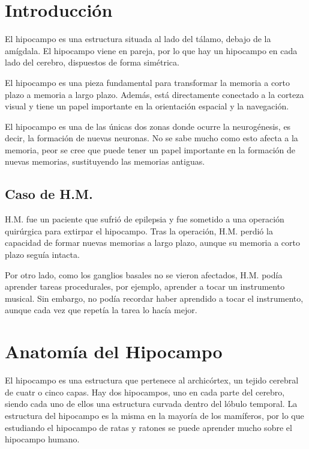 \documentclass[12pt, letterpaper]{article}
\title{\doctitle}
\author{Juan Luis Serradilla Tormos}
\date{\monthname[\month] de \the\year}
\begin{document}
\pagestyle{fancy}

\maketitle

\newpage
\tableofcontents

\newpage
\section{Introducción}
El hipocampo es una estructura  situada al lado del tálamo, debajo de la amígdala. El hipocampo viene en pareja, por lo que hay un hipocampo en cada lado del cerebro, dispuestos de forma simétrica.

El hipocampo es una pieza fundamental para transformar la memoria a corto plazo a memoria a largo plazo. Además, está directamente conectado a la corteza visual y tiene un papel importante en la orientación espacial y la navegación.

El hipocampo es una de las únicas dos zonas donde ocurre la neurogénesis, es decir, la formación de nuevas neuronas. No se sabe mucho como esto afecta a la memoria, peor se cree que puede tener un papel importante en la formación de nuevas memorias, sustituyendo las memorias antiguas.

\subsection{Caso de H.M.}
H.M. fue un paciente que sufrió de epilepsia y fue sometido a una operación quirúrgica para extirpar el hipocampo. Tras la operación, H.M. perdió la capacidad de formar nuevas memorias a largo plazo, aunque su memoria a corto plazo seguía intacta.

Por otro lado, como los ganglios basales no se vieron afectados, H.M. podía aprender tareas procedurales, por ejemplo, aprender a tocar un instrumento musical. Sin embargo, no podía recordar haber aprendido a tocar el instrumento, aunque cada vez que repetía la tarea lo hacía mejor.


\newpage
\section{Anatomía del Hipocampo}
El hipocampo es una estructura que pertenece al archicórtex, un tejido cerebral de cuatr o cinco capas. Hay dos hipocampos, uno en cada parte del cerebro, siendo cada uno de ellos una estructura curvada dentro del lóbulo temporal. La estructura del hipocampo es la misma en la mayoría de los mamíferos, por lo que estudiando el hipocampo de ratas y ratones se puede aprender mucho sobre el hipocampo humano.
\end{document}
